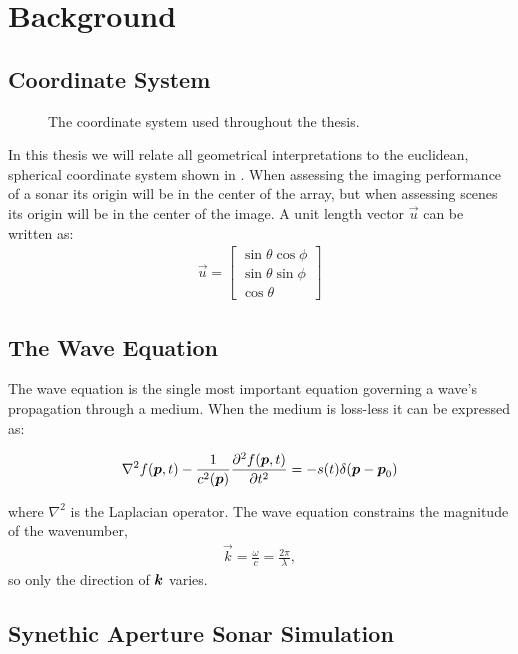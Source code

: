 \chapter{Background}


\section{Coordinate System}

\begin{figure}[th]
\caption{The coordinate system used throughout the thesis.}\label{geometry}
\end{figure}

In this thesis we will relate all geometrical interpretations to the euclidean, spherical coordinate system shown in . When assessing the imaging performance of a sonar its origin will be in the center of the array, but when assessing scenes its origin will be in the center of the image. A unit length vector $\vec u$ can be written as:
%
\begin{align*}
\vec u =
\begin{bmatrix}
\sin\theta \cos\phi \\
\sin\theta \sin\phi \\
\cos\theta
\end{bmatrix}
\end{align*}
%





\section{The Wave Equation}

The wave equation is the single most important equation governing a wave's propagation through a medium. When the medium is loss-less it can be expressed as:

\begin{align*}
\nabla^2 f(\boldsymbol{p},t) - \frac{1}{c^2(\boldsymbol{p})}\frac{\partial^2 f(\boldsymbol{p},t)}{\partial t^2} = -s(t) \delta(\boldsymbol{p}-\boldsymbol{p}_0)
\end{align*}

where $\nabla^2$ is the Laplacian operator. The wave equation constrains the magnitude of the wavenumber,
%
\begin{align*}
\vec k = \frac{\omega}{c} = \frac{2\pi}{\lambda},
\end{align*}
%
so only the direction of $\boldsymbol{k}$ varies.

\section{Synethic Aperture Sonar Simulation}

